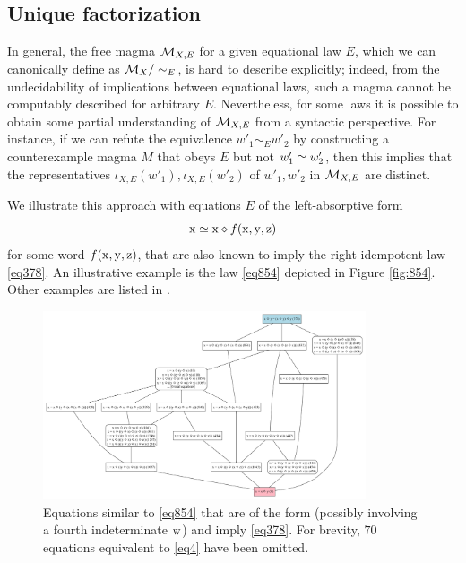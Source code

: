 \subsection{Unique factorization}

In general, the free magma ${\mathcal{M}}_{X,E}$ for a given equational law $E$, which we can canonically define as ${\mathcal{M}}_X / \sim_E$, is hard to describe explicitly; indeed, from the undecidability of implications between equational laws, such a magma cannot be computably described for arbitrary $E$.  Nevertheless, for some laws it is possible to obtain some partial understanding of ${\mathcal{M}}_{X,E}$ from a syntactic perspective.  For instance, if we can refute the equivalence $w'_1 \sim_E w'_2$ by constructing a counterexample magma $M$ that obeys $E$ but not $w'_1 \simeq w'_2$, then this implies that the representatives $\iota_{X,E}(w'_1), \iota_{X,E}(w'_2)$ of  $w'_1, w'_2$ in ${\mathcal{M}}_{X,E}$ are distinct.

We illustrate this approach with equations $E$ of the left-absorptive form
\begin{equation}\label{left-absorptive}
\mathrm{x} \simeq \mathrm{x} \diamond f(\mathrm{x},\mathrm{y},\mathrm{z})
\end{equation}
for some word $f(\mathrm{x},\mathrm{y},\mathrm{z})$, that are also known to imply the right-idempotent law \eqref{eq378}.  An illustrative example is the law \eqref{eq854} depicted in Figure \ref{fig:854}. Other examples are listed in .

\begin{figure}
  \centering
  \includegraphics[width=0.85\textwidth]{854-like.png}
  \caption{Equations similar to \eqref{eq854} that are of the form  (possibly involving a fourth indeterminate $\mathrm{w}$) and imply \eqref{eq378}.  For brevity, $70$ equations equivalent to \eqref{eq4} have been omitted.}
  \label{fig:854-like}
  \end{figure}


